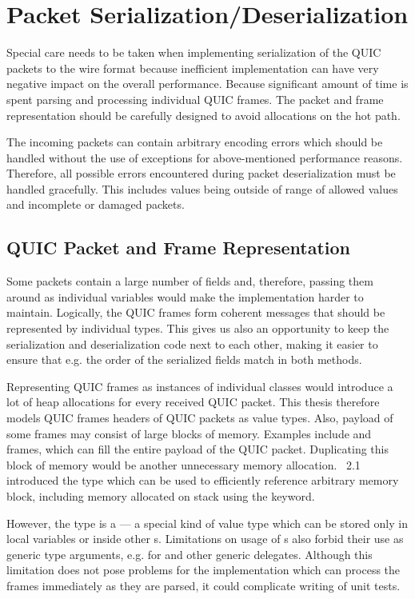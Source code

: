 \section{Packet Serialization/Deserialization}

Special care needs to be taken when implementing serialization of the QUIC packets to the wire
format because inefficient implementation can have very negative impact on the overall performance.
Because significant amount of time is spent parsing and processing individual QUIC frames. The
packet and frame representation should be carefully designed to avoid allocations on the hot path.

The incoming packets can contain arbitrary encoding errors which should be handled without the use
of exceptions for above-mentioned performance reasons. Therefore, all possible errors encountered
during packet deserialization must be handled gracefully. This includes values being outside of
range of allowed values and incomplete or damaged packets.

\subsection{QUIC Packet and Frame Representation}

Some packets contain a large number of fields and, therefore, passing them around as individual
variables would make the implementation harder to maintain. Logically, the QUIC frames form coherent
messages that should be represented by individual \dotnet{} types. This gives us also an opportunity to keep the serialization and deserialization code next to each other, making it easier to ensure that e.g. the order of the serialized fields match in both methods.

Representing QUIC frames as instances of individual classes would introduce a lot of heap
allocations for every received QUIC packet. This thesis therefore models QUIC frames headers of QUIC
packets as value types. Also, payload of some frames may consist of large blocks of memory. Examples
include \STREAM{} and \CRYPTO{} frames, which can fill the entire payload of the QUIC packet.
Duplicating this block of memory would be another unnecessary memory allocation. \dotnet{}~2.1
introduced the  type which can be used to efficiently reference arbitrary memory
block, including memory allocated on stack using the  keyword.

However, the  type is a  --- a special kind of value type which can
be stored only in local variables or inside other s. Limitations on usage of
s also forbid their use as generic type arguments, e.g. for  and
other generic delegates. Although this limitation does not pose problems for the \QuicConnection{}
implementation which can process the frames immediately as they are parsed, it could complicate
writing of unit tests.

